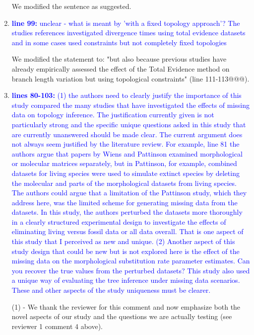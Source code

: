 \documentclass[12pt,letterpaper]{article}
\begin{document}
\begin{enumerate}
We modified the sentence as suggested.

\item{\textcolor{blue}{\textbf{line 99:} unclear - what is meant by 'with a fixed topology approach'? The studies references investigated divergence times using total evidence datasets and in some cases used constraints but not completely fixed topologies}}

We modified the statement to: "but also because previous studies have already empirically assessed the effect of the Total Evidence method on branch length variation but using topological constraints" (line 111-113@@@).

\item{\textcolor{blue}{\textbf{lines 80-103:} (1) the authors need to clearly justify the importance of this study compared the many studies that have investigated the effects of missing data on topology inference.
The justification currently given is not particularly strong and the specific unique questions asked in this study that are currently unanswered should be made clear.
The current argument does not always seem justified by the literature review.
For example, line 81 the authors argue that papers by Wiens and Pattinson examined morphological or molecular matrices separately, but in Pattinson, for example, combined datasets for living species were used to simulate extinct species by deleting the molecular and parts of the morphological datasets from living species.
The authors could argue that a limitation of the Pattinson study, which they address here, was the limited scheme for generating missing data from the datasets.
In this study, the authors perturbed the datasets more thoroughly in a clearly structured experimental design to investigate the effects of eliminating living versus fossil data or all data overall.
That is one aspect of this study that I perceived as new and unique.
(2) Another aspect of this study design that could be new but is not explored here is the effect of the missing data on the morphological substitution rate parameter estimates.
Can you recover the true values from the perturbed datasets?
This study also used a unique way of evaluating the tree inference under missing data scenarios.
These and other aspects of the study uniqueness must be clearer.}}

(1) - We thank the reviewer for this comment and now emphasize both the novel aspects of our study and the questions we are actually testing (see reviewer 1 comment 4 above).


\end{enumerate}
\end{document}
